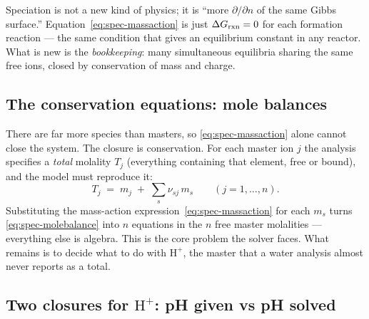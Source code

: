 \documentclass[11pt,a4paper]{article}
\begin{document}
\begin{intuition}
Speciation is not a new kind of physics; it is ``more $\partial/\partial
n$ of the same Gibbs surface.''  Equation~\eqref{eq:spec-massaction} is
just $\Delta G_{\rm rxn}=0$ for each formation reaction --- the same
condition that gives an equilibrium constant in any reactor.  What is new
is the \emph{bookkeeping}: many simultaneous equilibria sharing the same
free ions, closed by conservation of mass and charge.
\end{intuition}

\subsection{The conservation equations: mole balances}

There are far more species than masters, so \eqref{eq:spec-massaction}
alone cannot close the system.  The closure is conservation.  For each
master ion $j$ the analysis specifies a \emph{total} molality $T_j$
(everything containing that element, free or bound), and the model must
reproduce it:
\begin{equation}
   T_j \;=\; m_j \;+\; \sum_s \nu_{sj}\,m_s
   \qquad (j = 1,\dots,n).
   \label{eq:spec-molebalance}
\end{equation}
Substituting the mass-action expression~\eqref{eq:spec-massaction} for
each $m_s$ turns \eqref{eq:spec-molebalance} into $n$ equations in the
$n$ free master molalities --- everything else is algebra.  This is the
core problem the solver faces.  What remains is to decide what to do with
$\text{H}^+$, the master that a water analysis almost never reports as a
total.

\subsection{Two closures for \texorpdfstring{$\text{H}^+$}{H+}: pH given vs pH solved}
\end{document}
